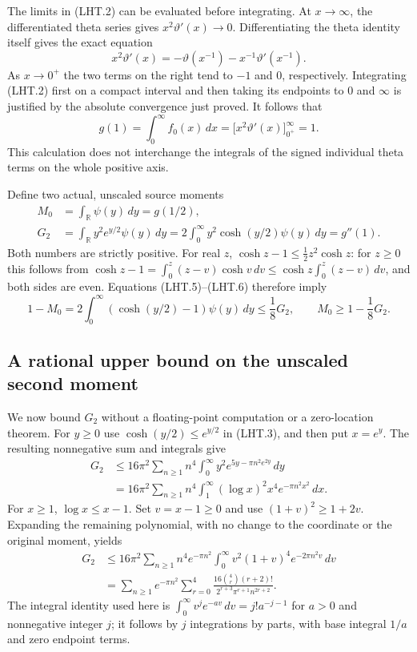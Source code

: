 The limits in (LHT.2) can be evaluated before integrating.
At $x\to\infty$, the differentiated theta series gives
$x^2\vartheta'(x)\to0$.  Differentiating the theta identity itself
gives the exact equation
\[
 x^2\vartheta'(x)
       =-\vartheta(x^{-1})-x^{-1}\vartheta'(x^{-1}).
\tag{LHT.4}
\]
As $x\to0^+$ the two terms on the right tend to $-1$ and $0$,
respectively.  Integrating (LHT.2) first on a compact interval and
then taking its endpoints to $0$ and $\infty$ is justified by the
absolute convergence just proved.  It follows that
\[
 g(1)=\int_0^\infty f_0(x)\,dx
     =\bigl[x^2\vartheta'(x)\bigr]_{0^+}^{\infty}=1.
\tag{LHT.5}
\]
This calculation does not interchange the integrals of the signed
individual theta terms on the whole positive axis.

Define two actual, unscaled source moments
\[
 \begin{split}
 M_0&=\int_{\mathbb{R}}\psi(y)\,dy=g(1/2),\\
 G_2&=\int_{\mathbb{R}}y^2e^{y/2}\psi(y)\,dy
       =2\int_0^\infty y^2\cosh(y/2)\psi(y)\,dy=g''(1).
 \end{split}
\tag{LHT.6}
\]
Both numbers are strictly positive.  For real $z$,
$\cosh z-1\leq \frac12 z^2\cosh z$: for $z\geq0$ this follows from
$\cosh z-1=\int_0^z(z-v)\cosh v\,dv
\leq\cosh z\int_0^z(z-v)\,dv$, and both sides are even.
Equations (LHT.5)--(LHT.6) therefore imply
\[
 1-M_0
 =2\int_0^\infty (\cosh(y/2)-1)\psi(y)\,dy
 \leq \frac18 G_2,
 \qquad M_0\geq1-\frac18G_2.
\tag{LHT.7}
\]

\subsection{A rational upper bound on the unscaled second moment}

We now bound $G_2$ without a floating-point computation or a
zero-location theorem.  For $y\geq0$ use
$\cosh(y/2)\leq e^{y/2}$ in (LHT.3), and then put $x=e^y$.
The resulting nonnegative sum and integrals give
\[
 \begin{split}
 G_2
 &\leq16\pi^2\sum_{n\geq1}n^4
      \int_0^\infty y^2e^{5y-\pi n^2e^{2y}}\,dy\\
 &=16\pi^2\sum_{n\geq1}n^4
      \int_1^\infty (\log x)^2x^4e^{-\pi n^2x^2}\,dx.
 \end{split}
\tag{LHT.8}
\]
For $x\geq1$, $\log x\leq x-1$.  Set $v=x-1\geq0$ and use
$(1+v)^2\geq1+2v$.  Expanding the remaining polynomial, with no
change to the coordinate or the original moment, yields
\[
 \begin{split}
 G_2
 &\leq16\pi^2\sum_{n\geq1}n^4e^{-\pi n^2}
         \int_0^\infty v^2(1+v)^4e^{-2\pi n^2v}\,dv\\
 &=\sum_{n\geq1}e^{-\pi n^2}
     \sum_{r=0}^{4}
       \frac{16\binom4r(r+2)!}
          {2^{r+3}\pi^{r+1}n^{2r+2}}.
 \end{split}
\tag{LHT.9}
\]
The integral identity used here is
$\int_0^\infty v^j e^{-av}\,dv=j!a^{-j-1}$ for $a>0$ and
nonnegative integer $j$; it follows by $j$ integrations by parts,
with base integral $1/a$ and zero endpoint terms.

